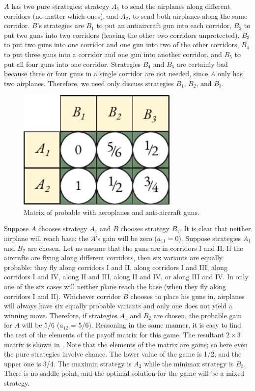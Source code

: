 $A$ has two pure strategies: strategy $A_{1}$ to send the airplanes along
different corridors (no matter which ones), and $A_{2}$, to send both
airplanes along the same corridor. $B$'s strategies are $B_{1}$ to put an
antiaircraft gun into each corridor, $B_{2}$ to put two guns into two
corridors (leaving the other two corridors unprotected), $B_{3}$ to put two
guns into one corridor and one gun into two of the other corridors, $B_{4}$
to put three guns into a corridor and one gun into another corridor,
and $B_{5}$ to put all four guns into one corridor. Strategies $B_{4}$ and $B_{5}$ are certainly bad because three or four guns in a single corridor are not
needed, since $A$ only has two airplanes. Therefore, we need only discuss
strategies $B_{1}$, $B_{2}$, and $B_{3}$.

 \begin{figure}%
 \centering
 \includegraphics[width=0.7\textwidth]{figures/aa-matrix.pdf}
\caption{Matrix of probable with aeroplanes and anti-aircraft guns.\label{aa-matrix}}
 \end{figure}
Suppose $A$ chooses strategy $A_{1}$ and $B$ chooses strategy $B_{1}$. It is clear that neither airplane will reach base: the $A$'s gain will be zero ($a_{11}=0$). Suppose strategies $A_{1}$ and $B_{2}$ are chosen. Let us assume that the guns are in corridors I and II. If the aircrafts are flying along different corridors, then six variants are equally probable: they fly along corridors I and II, along corridors I and III, along corridors I and IV, along II and III, along II and IV, or along III and IV. In only one of the six cases will neither plane reach the base (when they fly along corridors I and II). Whichever corridor $B$ chooses to place his guns in, airplanes will always have six equally probable variants and only one does not yield a winning move. Therefore, if strategies $A_{1}$ and 
$B_{2}$ are chosen, the probable gain for $A$ will be 5/6 ($a_{12}$ = 5/6). Reasoning in the same manner, it is easy to find the rest of the elements of the
payoff matrix for this game. The resultant $2 \times 3$ matrix is shown in
. Note that the elements of the matrix are  gains; so here even the pure strategies involve chance. The lower value of the
game is 1/2, and the upper one is 3/4. The maximin strategy is $A_{2}$ while
the minimax strategy is $B_{3}$. There is no saddle point, and the optimal
solution for the game will be a mixed strategy.

